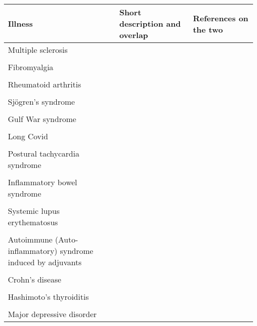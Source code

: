 \begin{tabular}[c]{m{} m{} m{}}
\toprule
Illness & Short description and overlap & References on the two \\
\midrule
Multiple sclerosis & & \\
& & \\
Fibromyalgia& & \\
& & \\
Rheumatoid arthritis& & \citet{davis2008ChronicStressa, ali2017FatiguePsychosocial}\\
& & \\
Sj\"{o}gren's syndrome& & \citet{calabrese1994ChronicFatigue, kim2023CharacterizingSjogrenAssociated}\\
& & \\
Gulf War syndrome& & \citet{kang2003PosttraumaticStress}\\
& & \\
Long Covid& & \\
& & \\
Postural tachycardia syndrome& & \\
& & \\
Inflammatory bowel syndrome& & \citet{whitehead2002SystematicReview}\\
& & \\
Systemic lupus erythematosus& & \\
& & \\
Autoimmune (Auto-inflammatory) syndrome induced by adjuvants& & \\
& & \\
Crohn’s disease& & \\
& & \\
Hashimoto's thyroiditis& & \\
& & \\
Major depressive disorder& & \\
\bottomrule
\end{tabular}


